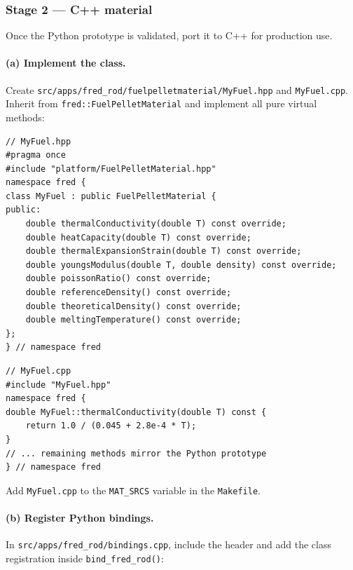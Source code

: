 \documentclass[11pt,a4paper]{article}
\begin{document}
\subsubsection{Stage 2 --- C++ material}

Once the Python prototype is validated, port it to C++ for production use.

\paragraph{(a) Implement the class.}
Create \texttt{src/apps/fred\_rod/fuelpelletmaterial/MyFuel.hpp} and \texttt{MyFuel.cpp}.  Inherit from \texttt{fred::FuelPelletMaterial} and implement all pure virtual methods:

\begin{lstlisting}
// MyFuel.hpp
#pragma once
#include "platform/FuelPelletMaterial.hpp"
namespace fred {
class MyFuel : public FuelPelletMaterial {
public:
    double thermalConductivity(double T) const override;
    double heatCapacity(double T) const override;
    double thermalExpansionStrain(double T) const override;
    double youngsModulus(double T, double density) const override;
    double poissonRatio() const override;
    double referenceDensity() const override;
    double theoreticalDensity() const override;
    double meltingTemperature() const override;
};
} // namespace fred
\end{lstlisting}

\begin{lstlisting}
// MyFuel.cpp
#include "MyFuel.hpp"
namespace fred {
double MyFuel::thermalConductivity(double T) const {
    return 1.0 / (0.045 + 2.8e-4 * T);
}
// ... remaining methods mirror the Python prototype
} // namespace fred
\end{lstlisting}

Add \texttt{MyFuel.cpp} to the \texttt{MAT\_SRCS} variable in the \texttt{Makefile}.

\paragraph{(b) Register Python bindings.}
In \texttt{src/apps/fred\_rod/bindings.cpp}, include the header and add the class registration inside \texttt{bind\_fred\_rod()}:
\end{document}
